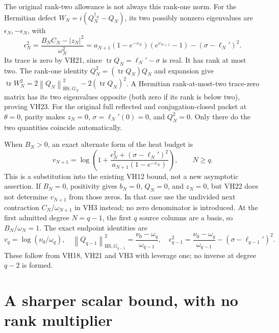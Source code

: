\documentclass[11pt]{article}
\newcommand{\tr}{\operatorname{tr}}\newcommand{\norm}[1]{\left\lVert#1\right\rVert}
\begin{document}
The original rank-two allowance is not always this rank-one norm.
For the Hermitian defect \(W_N=i(Q_N^{\dagger_N}-Q_N)\), its two
possibly nonzero eigenvalues are \(\epsilon_N,-\epsilon_N\), with
\begin{equation}\tag{VH23}\label{VH23}
\boxed{\quad
\epsilon_N^2=\frac{B_NC_N-|z_N|^2}{\omega_N^2}
=a_{N+1}(1-e^{-v_N})(e^{v_{N+1}}-1)
-(\sigma-\ell_N')^2.\quad}
\end{equation}
Its trace is zero by VH21, since \(\tr Q_N=\ell_N'-\sigma\) is real.
It has rank at most two. The rank-one identity
\(Q_N^2=(\tr Q_N)Q_N\) and expansion give
\(\tr W_N^2=2\norm{Q_N}_{\mathrm{HS},G_N}^2-2(\tr Q_N)^2\).
A Hermitian rank-at-most-two trace-zero matrix has its two eigenvalues
opposite (both zero if its rank is below two), proving VH23.
For the original full reflected and conjugation-closed packet at
\(\theta=0\), parity makes \(z_N=0\), \(\sigma=\ell_N'(0)=0\),
and \(Q_N^2=0\). Only there do the two quantities coincide automatically.

When \(B_N>0\), an exact alternate form of the heat budget is
\begin{equation}\tag{VH24}\label{VH24}
v_{N+1}=\log\!\left(1+
\frac{\epsilon_N^2+(\sigma-\ell_N')^2}
{a_{N+1}(1-e^{-v_N})}\right),\qquad N\ge q.
\end{equation}
This is a substitution into the existing VH12 bound, not a new
asymptotic assertion. If \(B_N=0\), positivity gives \(b_N=0\),
\(Q_N=0\), and \(z_N=0\), but VH22 does not determine \(v_{N+1}\)
from those zeros. In that case use the undivided next contraction
\(C_N/\omega_{N+1}\) in VH3 instead; no zero denominator is introduced.
At the first admitted degree \(N=q-1\), the first \(q\) source columns
are a basis, so \(B_N/\omega_N=1\). The exact endpoint identities are
\begin{equation}\tag{VH25}\label{VH25}
v_q=\log(\nu_0/\omega_q),\quad
\norm{Q_{q-1}}_{\mathrm{HS},G_{q-1}}^2
=\frac{\nu_0-\omega_q}{\omega_{q-1}},\quad
\epsilon_{q-1}^2=\frac{\nu_0-\omega_q}{\omega_{q-1}}
-(\sigma-\ell_{q-1}')^2.
\end{equation}
These follow from VH18, VH21 and VH3 with leverage one; no inverse
at degree \(q-2\) is formed.

\section{A sharper scalar bound, with no rank multiplier}
\end{document}
